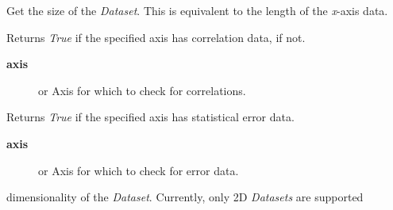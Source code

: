 \documentclass[a4paper,10pt,english]{sphinxmanual}
\begin{document}
\begin{fulllineitems}
\begin{fulllineitems}
\begin{description}
\end{description}

\end{fulllineitems}


\begin{fulllineitems}
\label{index:kafe.dataset.Dataset.get_size}
Get the size of the \emph{Dataset}. This is equivalent to the length of the
\emph{x}-axis data.

\end{fulllineitems}


\begin{fulllineitems}
\label{index:kafe.dataset.Dataset.has_correlations}
Returns \emph{True} if the specified axis has correlation data,  if
not.
\begin{description}
\item[{\textbf{axis}}] \leavevmode{[} or \code{'y'}{]}
Axis for which to check for correlations.

\end{description}

\end{fulllineitems}


\begin{fulllineitems}
\label{index:kafe.dataset.Dataset.has_errors}
Returns \emph{True} if the specified axis has statistical error data.
\begin{description}
\item[{\textbf{axis}}] \leavevmode{[} or \code{'y'}{]}
Axis for which to check for error data.

\end{description}

\end{fulllineitems}


\begin{fulllineitems}
\label{index:kafe.dataset.Dataset.n_axes}
dimensionality of the \emph{Dataset}. Currently, only 2D \emph{Datasets} are
supported


\end{fulllineitems}
\end{fulllineitems}
\end{document}
